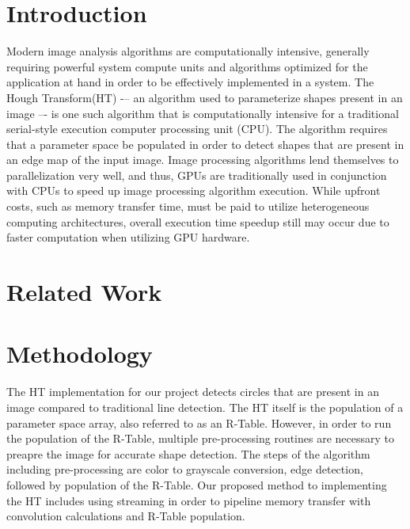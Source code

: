 \documentclass[conference]{IEEEtran}
\begin{document}
\section{Introduction}
Modern image analysis algorithms are computationally intensive, generally requiring powerful system compute units and algorithms optimized for the application at hand in order to be effectively implemented in a system. 
The Hough Transform(HT)\cite{BALLARD1981111} -– an algorithm used to parameterize shapes present in an image –- is one such algorithm that is computationally intensive for a traditional serial-style execution computer processing unit (CPU).
The algorithm requires that a parameter space be populated in order to detect shapes that are present in an edge map of the input image.
Image processing algorithms lend themselves to parallelization very well, and thus, GPUs are traditionally used in conjunction with CPUs to speed up image processing algorithm execution.
While upfront costs, such as memory transfer time, must be paid to utilize heterogeneous computing architectures, overall execution time speedup still may occur due to faster computation when utilizing GPU hardware.




\section{Related Work}


\section{Methodology}
The HT implementation for our project detects circles that are present in an image compared to traditional line detection.
The HT itself is the population of a parameter space array, also referred to as an R-Table.
However, in order to run the population of the R-Table, multiple pre-processing routines are necessary to preapre the image for accurate shape detection.
The steps of the algorithm including pre-processing are color to grayscale conversion, edge detection, followed by population of the R-Table.
Our proposed method to implementing the HT includes using streaming in order to pipeline memory transfer with convolution calculations and R-Table population.
\end{document}
